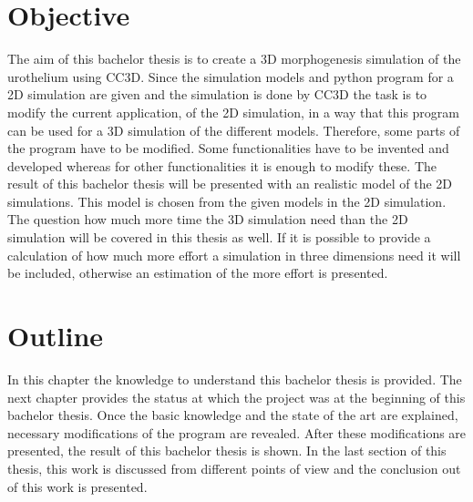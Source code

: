 \section{Objective}
The aim of this bachelor thesis is to create a 3D morphogenesis simulation of the urothelium using \ac{CC3D}. Since the simulation models and python program for a 2D simulation are given and the simulation is done by \ac{CC3D} the task is to modify the current application, of the 2D simulation, in a way that this program can be used for a 3D simulation of the different models. \newline
Therefore, some parts of the program have to be modified. Some functionalities have to be invented and developed whereas for other functionalities it is enough to modify these. \newline
The result of this bachelor thesis will be presented with an realistic model of the 2D simulations. This model is chosen from the given models in the 2D simulation. The question how much more time the 3D simulation need than the 2D simulation will be covered in this thesis as well. If it is possible to provide a calculation of how much more effort a simulation in three dimensions need it will be included, otherwise an estimation of the more effort is presented.


\section{Outline}
In this chapter the knowledge to understand this bachelor thesis is provided. The next chapter provides the status at which the project was at the beginning of this bachelor thesis. Once the basic knowledge and the state of the art are explained, necessary modifications of the program are revealed. After these modifications are presented, the result of this bachelor thesis is shown. In the last section of this thesis, this work is discussed from different points of view and the conclusion out of this work is presented.